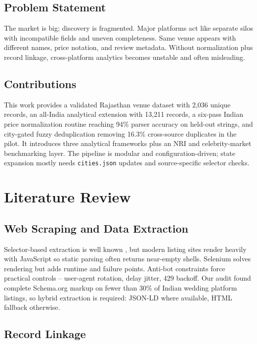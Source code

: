\documentclass[conference]{IEEEtran}
\begin{document}
\subsection{Problem Statement}

The market is big; discovery is fragmented. Major platforms act like separate silos with incompatible fields and uneven completeness. Same venue appears with different names, price notation, and review metadata. Without normalization plus record linkage, cross-platform analytics becomes unstable and often misleading.

\subsection{Contributions}

This work provides a validated Rajasthan venue dataset with 2,036 unique records, an all-India analytical extension with 13,211 records, a six-pass Indian price normalization routine reaching 94\% parser accuracy on held-out strings, and city-gated fuzzy deduplication removing 16.3\% cross-source duplicates in the pilot. It introduces three analytical frameworks plus an NRI and celebrity-market benchmarking layer. The pipeline is modular and configuration-driven; state expansion mostly needs \texttt{cities.json} updates and source-specific selector checks.

\section{Literature Review}

\subsection{Web Scraping and Data Extraction}

Selector-based extraction is well known \cite{b2}, but modern listing sites render heavily with JavaScript so static parsing often returns near-empty shells. Selenium \cite{b3} solves rendering but adds runtime and failure points. Anti-bot constraints force practical controls -- user-agent rotation, delay jitter, 429 backoff. Our audit found complete Schema.org markup on fewer than 30\% of Indian wedding platform listings, so hybrid extraction is required: JSON-LD where available, HTML fallback otherwise.

\subsection{Record Linkage}
\end{document}
